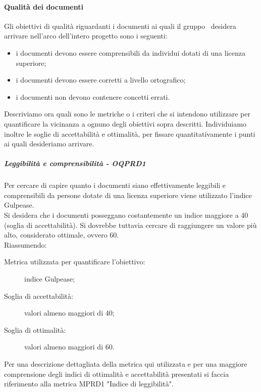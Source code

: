 \documentclass[../PianoDiQualifica.tex]{subfiles}
\begin{document}
			\paragraph{Qualità dei documenti}
			Gli obiettivi di qualità riguardanti i documenti ai quali il gruppo \leaf\ desidera arrivare nell'arco dell'intero progetto sono i seguenti:
			\begin{itemize}
				\item i documenti devono essere comprensibili da individui dotati di una licenza superiore;
				\item i documenti devono essere corretti a livello ortografico;
				\item i documenti non devono contenere concetti errati.
			\end{itemize}
			Descriviamo ora quali sono le metriche o i criteri che si intendono utilizzare per quantificare la vicinanza a ognuno degli obiettivi sopra descritti. Individuiamo inoltre le soglie di accettabilità e ottimalità, per fissare quantitativamente i punti ai quali desideriamo arrivare.
				
				\subparagraph{Leggibilità e comprensibilità - OQPRD1}
				Per cercare di capire quanto i documenti siano effettivamente leggibili e comprensibili da persone dotate di una licenza superiore viene utilizzato l’indice Gulpease\g.\\
				Si desidera che i documenti posseggano costantemente un indice maggiore a 40 (soglia di accettabilità). Si dovrebbe tuttavia cercare di raggiungere un valore più alto, considerato ottimale, ovvero 60.\\
				Riassumendo:
				\begin{description}
					\item[Metrica utilizzata per quantificare l’obiettivo:] indice Gulpease\g;
					\item[Soglia di accettabilità:] valori almeno maggiori di 40;
					\item[Soglia di ottimalità:] valori almeno maggiori di 60.
				\end{description}
				Per una descrizione dettagliata della metrica qui utilizzata e per una maggiore comprensione degli indici di ottimalità e accettabilità presentati si faccia riferimento alla metrica MPRD1 "Indice di leggibilità".
				
\end{document}
